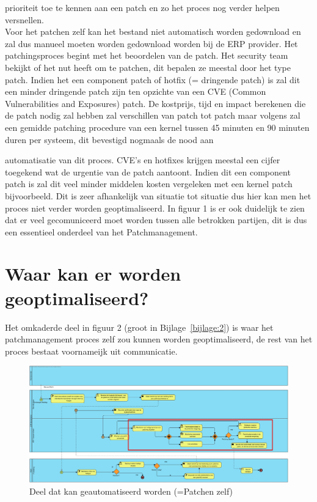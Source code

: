 prioriteit toe te kennen aan een patch en zo het proces nog verder helpen versnellen. \\





Voor het patchen zelf kan het bestand niet automatisch worden gedownload en zal dus manueel moeten worden gedownload worden bij de ERP provider. Het patchingsproces begint met het beoordelen van de patch. Het security team bekijkt of het nut heeft
om te patchen, dit bepalen ze meestal door het type patch. Indien het een component patch of hotfix (= dringende patch) is zal dit een minder dringende patch zijn ten opzichte van een CVE (Common Vulnerabilities and Exposures) patch. De kostprijs, tijd en impact berekenen
die de patch nodig zal hebben zal verschillen van patch tot patch maar volgens \textcite{Heyndrickx2024} zal een gemidde patching procedure van een kernel tussen 45 minuten en 90 minuten duren per systeem, dit bevestigd nogmaals de nood aan

automatisatie van dit proces. CVE's en hotfixes krijgen meestal een cijfer toegekend wat de urgentie van de patch aantoont. Indien dit een component patch is zal dit veel minder middelen kosten vergeleken
met een kernel patch bijvoorbeeld. Dit is zeer afhankelijk van situatie tot situatie dus hier kan men het proces niet verder worden geoptimaliseerd. In figuur 1 is er ook duidelijk te zien dat er veel gecomuniceerd moet worden tussen alle betrokken partijen, dit is dus een essentieel onderdeel van het Patchmanagement. \\


\section{Waar kan er worden geoptimaliseerd?}

Het omkaderde deel in figuur 2 (groot in Bijlage~\ref{bijlage:2}) is waar het patchmanagement proces zelf zou kunnen worden geoptimaliseerd, de rest van het proces bestaat voornameijk uit communicatie.
 \begin{figure}[h]
    \centering
    \includegraphics[width=\textwidth]{huidigesituatie2.png}
    \caption{Deel dat kan geautomatiseerd worden (=Patchen zelf)}
     \label{fig:huidigesituatie2}
\end{figure}
\newpage


